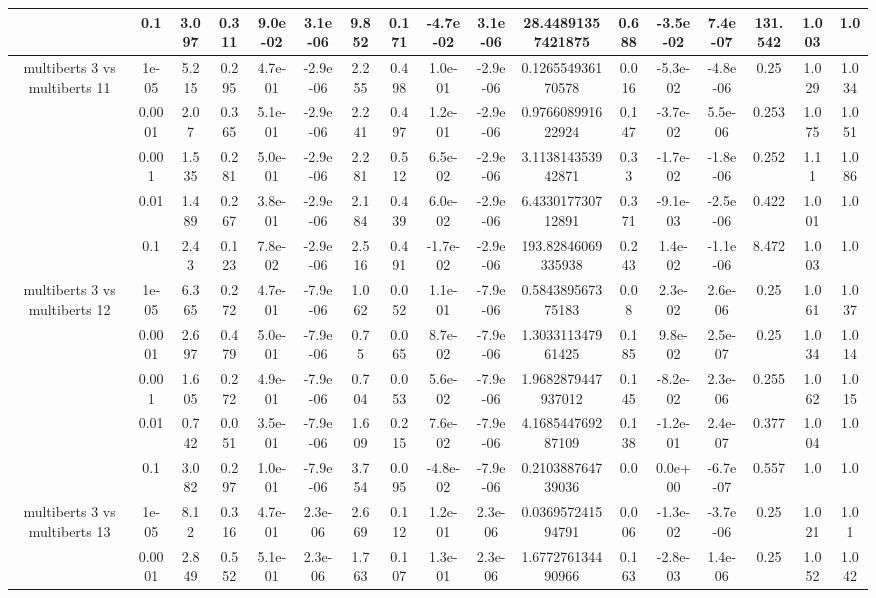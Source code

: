 \begin{tabular}{|c|c|c|c|c|c|c|c|c|c|c|c|c|c|c|c|c|}
 & 0.1 & 3.097 & 0.311 & 9.0e-02 & 3.1e-06 & 9.852 & 0.171 & -4.7e-02 & 3.1e-06 & 28.44891357421875 & 0.688 & -3.5e-02 & 7.4e-07 & 131.542 & 1.003 & 1.0 \\
\hline
\multirow{5}{*}{multiberts 3 vs multiberts 11} & 1e-05 & 5.215 & 0.295 & 4.7e-01 & -2.9e-06 & 2.255 & 0.498 & 1.0e-01 & -2.9e-06 & 0.126554936170578 & 0.016 & -5.3e-02 & -4.8e-06 & 0.25 & 1.029 & 1.034 \\
 & 0.0001 & 2.07 & 0.365 & 5.1e-01 & -2.9e-06 & 2.241 & 0.497 & 1.2e-01 & -2.9e-06 & 0.976608991622924 & 0.147 & -3.7e-02 & 5.5e-06 & 0.253 & 1.075 & 1.051 \\
 & 0.001 & 1.535 & 0.281 & 5.0e-01 & -2.9e-06 & 2.281 & 0.512 & 6.5e-02 & -2.9e-06 & 3.113814353942871 & 0.33 & -1.7e-02 & -1.8e-06 & 0.252 & 1.11 & 1.086 \\
 & 0.01 & 1.489 & 0.267 & 3.8e-01 & -2.9e-06 & 2.184 & 0.439 & 6.0e-02 & -2.9e-06 & 6.433017730712891 & 0.371 & -9.1e-03 & -2.5e-06 & 0.422 & 1.001 & 1.0 \\
 & 0.1 & 2.43 & 0.123 & 7.8e-02 & -2.9e-06 & 2.516 & 0.491 & -1.7e-02 & -2.9e-06 & 193.82846069335938 & 0.243 & 1.4e-02 & -1.1e-06 & 8.472 & 1.003 & 1.0 \\
\hline
\multirow{5}{*}{multiberts 3 vs multiberts 12} & 1e-05 & 6.365 & 0.272 & 4.7e-01 & -7.9e-06 & 1.062 & 0.052 & 1.1e-01 & -7.9e-06 & 0.584389567375183 & 0.08 & 2.3e-02 & 2.6e-06 & 0.25 & 1.061 & 1.037 \\
 & 0.0001 & 2.697 & 0.479 & 5.0e-01 & -7.9e-06 & 0.75 & 0.065 & 8.7e-02 & -7.9e-06 & 1.303311347961425 & 0.185 & 9.8e-02 & 2.5e-07 & 0.25 & 1.034 & 1.014 \\
 & 0.001 & 1.605 & 0.272 & 4.9e-01 & -7.9e-06 & 0.704 & 0.053 & 5.6e-02 & -7.9e-06 & 1.9682879447937012 & 0.145 & -8.2e-02 & 2.3e-06 & 0.255 & 1.062 & 1.015 \\
 & 0.01 & 0.742 & 0.051 & 3.5e-01 & -7.9e-06 & 1.609 & 0.215 & 7.6e-02 & -7.9e-06 & 4.168544769287109 & 0.138 & -1.2e-01 & 2.4e-07 & 0.377 & 1.004 & 1.0 \\
 & 0.1 & 3.082 & 0.297 & 1.0e-01 & -7.9e-06 & 3.754 & 0.095 & -4.8e-02 & -7.9e-06 & 0.210388764739036 & 0.0 & 0.0e+00 & -6.7e-07 & 0.557 & 1.0 & 1.0 \\
\hline
\multirow{5}{*}{multiberts 3 vs multiberts 13} & 1e-05 & 8.12 & 0.316 & 4.7e-01 & 2.3e-06 & 2.669 & 0.112 & 1.2e-01 & 2.3e-06 & 0.036957241594791 & 0.006 & -1.3e-02 & -3.7e-06 & 0.25 & 1.021 & 1.01 \\
 & 0.0001 & 2.849 & 0.552 & 5.1e-01 & 2.3e-06 & 1.763 & 0.107 & 1.3e-01 & 2.3e-06 & 1.677276134490966 & 0.163 & -2.8e-03 & 1.4e-06 & 0.25 & 1.052 & 1.042 \\

\end{tabular}
